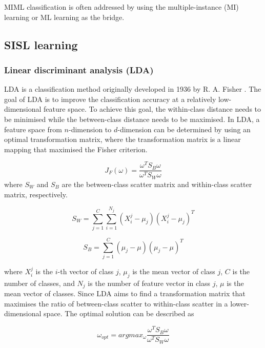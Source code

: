 MIML classification is often addressed by using the multiple-instance (MI) learning or ML learning as the bridge. 




\subsection{SISL learning}

\subsubsection{Linear discriminant analysis (LDA)}
LDA is a classification method originally developed in 1936 by R. A. Fisher \citep{fisher1936use}. The goal of LDA is to improve the classification accuracy at a relatively low-dimensional feature space. To achieve this goal, the within-class distance needs to be minimised while the between-class distance needs to be maximised. In LDA, a feature space from $n$-dimension to $d$-dimension can be determined by using an optimal transformation matrix, where the transformation matrix is a linear mapping that maximised the Fisher criterion.

\begin{equation}
J_{F}(\omega)=\frac{\omega^{T}S_{B}\omega}{\omega^{T}S_{W}\omega}
\end{equation}
where $S_{W}$ and $S_{B}$ are the between-class scatter matrix and within-class scatter matrix, respectively.

\begin{equation}
S_{W}=\sum_{j=1}^{C}\sum_{i=1}^{N_{j}}(X_{i}^{j}-\mu_{j})(X_{i}^{j}-\mu_{j})^{T}
\end{equation}

\begin{equation}
S_{B}=\sum_{j=1}^{C}(\mu_{j}-\mu)(\mu_{j}-\mu)^{T}
\end{equation}

where $X_{i}^{j}$ is the $i$-th vector of class $j$, $\mu_{j}$ is the mean vector of class $j$, $C$ is the number of classes, and $N_{j}$ is the number of feature vector in class $j$, $\mu$ is the mean vector of classes. 
Since LDA aims to find a transformation matrix that maximises the ratio of between-class scatter to within-class scatter in a lower-dimensional space. The optimal solution can be described as 

\begin{equation}
\omega_{opt}=argmax_{\omega}\frac{\omega^{T}S_{B}\omega}{\omega^{T}S_{W}\omega} 
\end{equation}


